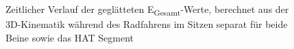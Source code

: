 \documentclass[
  letterpaper,
  DIV=11]{scrartcl}
\begin{document}
\begin{figure}


\caption{\label{fig-PInt_Kinematik_HAT_E_gesamt_sitzen}Zeitlicher
Verlauf der geglätteten E\textsubscript{Gesamt}-Werte, berechnet aus der
3D-Kinematik während des Radfahrens im Sitzen separat für beide Beine
sowie das HAT Segment}

\end{figure}%
\end{document}
